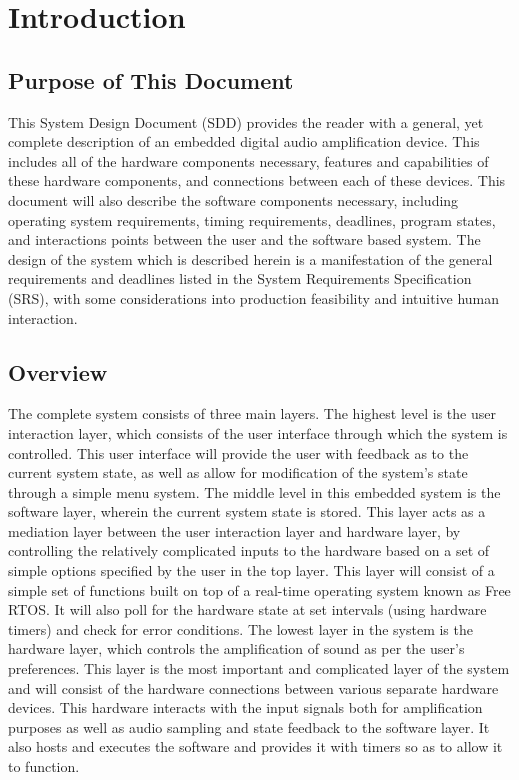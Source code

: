 \cleardoublepage
{}
{}
\chapter*{Introduction}
\section*{Purpose of This Document}
This System Design Document (SDD) provides the reader with a general, yet complete description of an embedded digital audio amplification device. This includes all of the hardware components necessary, features and capabilities of these hardware components, and connections between each of these devices. This document will also describe the software components necessary, including operating system requirements, timing requirements, deadlines, program states, and interactions points between the user and the software based system. The design of the system which is described herein is a manifestation of the general requirements and deadlines listed in the System Requirements Specification (SRS), with some considerations into production feasibility and intuitive human interaction.

\section*{Overview}
The complete system consists of three main layers. The highest level is the user interaction layer, which consists of the user interface through which the system is controlled. This user interface will provide the user with feedback as to the current system state, as well as allow for modification of the system’s state through a simple menu system. The middle level in this embedded system is the software layer, wherein the current system state is stored. This layer acts as a mediation layer between the user interaction layer and hardware layer, by controlling the relatively complicated inputs to the hardware based on a set of simple options specified by the user in the top layer. This layer will consist of a simple set of functions built on top of a real-time operating system known as Free RTOS. It will also poll for the hardware state at set intervals (using hardware timers) and check for error conditions. The lowest layer in the system is the hardware layer, which controls the amplification of sound as per the user’s preferences. This layer is the most important and complicated layer of the system and will consist of the hardware connections between various separate hardware devices. This hardware interacts with the input signals both for amplification purposes as well as audio sampling and state feedback to the software layer. It also hosts and executes the software and provides it with timers so as to allow it to function.

